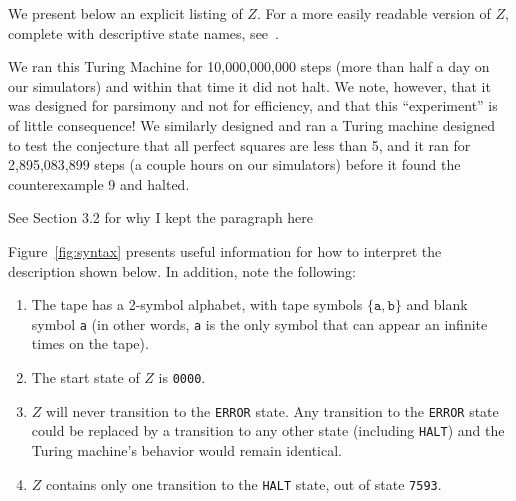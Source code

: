 \documentclass[11pt]{article}
\newcommand{\zhaltstate}{\texttt{7593}}
\begin{document}
\begin{appendices}
We present below an explicit listing of $Z$. For a more easily readable version of $Z$, complete with descriptive state names, see~\cite{github}. 

We ran this Turing Machine for 10,000,000,000 steps (more than half a day on our simulators) and within that time it did not halt. We note, however, that it was designed for parsimony and not for efficiency, and that this ``experiment'' is of little consequence! We similarly designed and ran a Turing machine designed to test the conjecture that all perfect squares are less than 5, and it ran for 2,895,083,899 steps (a couple hours on our simulators) before it found the counterexample 9 and halted.

{\color{red} See Section 3.2 for why I kept the paragraph here}

Figure~\ref{fig:syntax} presents useful information for how to interpret the description shown below. In addition, note the following:

\begin{enumerate}

\item The tape has a 2-symbol alphabet, with tape symbols $\{\texttt{a}, \texttt{b}\}$ and blank symbol \texttt{a} (in other words, \texttt{a} is the only symbol that can appear an infinite times on the tape).
\item The start state of $Z$ is \texttt{0000}.
\item $Z$ will never transition to the \texttt{ERROR} state. Any transition to the \texttt{ERROR} state could be replaced by a transition to any other state (including \texttt{HALT}) and the Turing machine's behavior would remain identical.
\item $Z$ contains only one transition to the \texttt{HALT} state, out of state \zhaltstate.

\end{enumerate}


\end{appendices}
\end{document}
